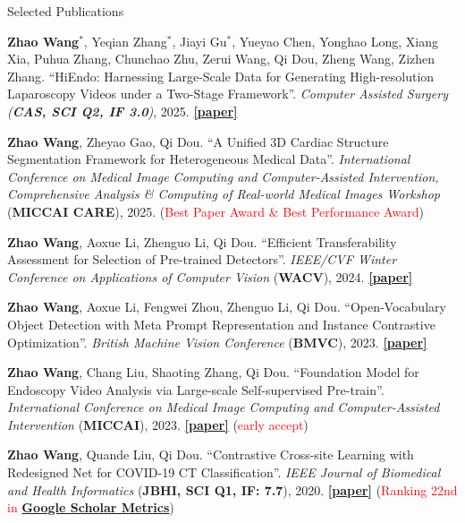 \documentclass[a4paper]{resume} %
\newcommand{\hl}[1]{\textcolor{red}{#1}}
\begin{document}
\begin{rSection}{Selected Publications}
\begin{enumerate}[label={[\arabic*]}, topsep=0em, leftmargin=1.4em, itemsep=-0.5em]
\item {\bf Zhao Wang}$^*$, Yeqian Zhang$^*$, Jiayi Gu$^*$, Yueyao Chen, Yonghao Long, Xiang Xia, Puhua Zhang, Chunchao Zhu, Zerui Wang, Qi Dou, Zheng Wang, Zizhen Zhang. “HiEndo: Harnessing Large-Scale Data for Generating High-resolution Laparoscopy Videos under a Two-Stage Framework”. {\it Computer Assisted Surgery ({\bf CAS, SCI Q2, IF 3.0})}, 2025. \href{https://www.tandfonline.com/doi/full/10.1080/24699322.2025.2536643}{\bf [paper]}

\item {\bf Zhao Wang},  Zheyao Gao, Qi Dou. “A Unified 3D Cardiac Structure Segmentation Framework for Heterogeneous Medical Data”. {\it International Conference on Medical Image Computing and Computer-Assisted Intervention, Comprehensive Analysis \& Computing of Real-world Medical Images Workshop} ({\bf MICCAI CARE}), 2025.  (\hl{Best Paper Award \& Best Performance Award}) %


\item {\bf Zhao Wang}, Aoxue Li, Zhenguo Li, Qi Dou. “Efficient Transferability Assessment for Selection of Pre-trained Detectors”. {\it IEEE/CVF Winter Conference on Applications of Computer Vision} ({\bf WACV}), 2024. \href{https://arxiv.org/abs/2403.09432}{\bf [paper]}
	
\item {\bf Zhao Wang}, Aoxue Li, Fengwei Zhou, Zhenguo Li, Qi Dou. “Open-Vocabulary Object Detection with Meta Prompt Representation and Instance Contrastive Optimization”. {\it British Machine Vision Conference} ({\bf BMVC}), 2023. \href{https://arxiv.org/abs/2403.09433}{\bf [paper]}

\item {\bf Zhao Wang}, Chang Liu, Shaoting Zhang, Qi Dou. “Foundation Model for Endoscopy Video Analysis via Large-scale Self-supervised Pre-train”. {\it International Conference on Medical Image Computing and Computer-Assisted Intervention} ({\bf MICCAI}), 2023. \href{https://arxiv.org/abs/2306.16741}{\bf [paper]} (\hl{early accept})



\item {\bf Zhao Wang}, Quande Liu, Qi Dou. “Contrastive Cross-site Learning with Redesigned Net for COVID-19 CT Classification”. {\it IEEE Journal of Biomedical and Health Informatics} ({\bf JBHI, SCI Q1, IF: 7.7}), 2020. \href{https://ieeexplore.ieee.org/document/9194240}{\bf [paper]} (\hl{Ranking 22nd in \href{https://scholar.google.com/citations?hl=en\&view\_op=list\_hcore\&venue=L0V86ydYD6YJ.2024\&vq=eng\_medicalinformatics\&cstart=20}{\bf Google Scholar Metrics}})



\end{enumerate}
\end{rSection}
\end{document}
